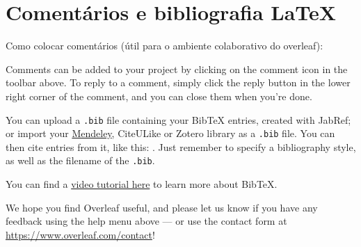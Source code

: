 \documentclass[a4paper]{article}
\begin{document}
\section{Comentários e bibliografia \LaTeX{}}

Como colocar comentários (útil para o ambiente colaborativo do overleaf):

Comments can be added to your project by clicking on the comment icon in the toolbar above. %
%
%
To reply to a comment, simply click the reply button in the lower right corner of the comment, and you can close them when you're done.

You can upload a \verb|.bib| file containing your BibTeX entries, created with JabRef; or import your \href{https://www.overleaf.com/blog/184}{Mendeley}, CiteULike or Zotero library as a \verb|.bib| file. You can then cite entries from it, like this: \cite{greenwade93}. Just remember to specify a bibliography style, as well as the filename of the \verb|.bib|.

You can find a \href{https://www.overleaf.com/help/97-how-to-include-a-bibliography-using-bibtex}{video tutorial here} to learn more about BibTeX.

We hope you find Overleaf useful, and please let us know if you have any feedback using the help menu above --- or use the contact form at \url{https://www.overleaf.com/contact}!



\end{document}
